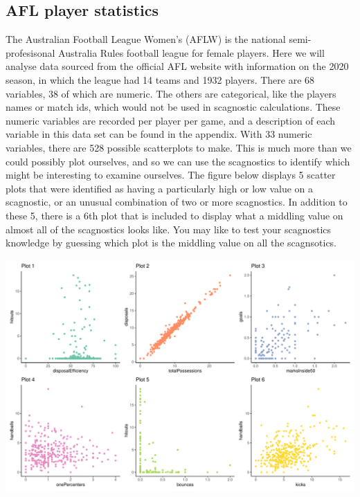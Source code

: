 \hypertarget{afl-player-statistics}{%
\subsection{AFL player statistics}\label{afl-player-statistics}}

The Australian Football League Women's (AFLW) is the national
semi-profesisonal Australia Rules football league for female players.
Here we will analyse data sourced from the official AFL website with
information on the 2020 season, in which the league had 14 teams and
1932 players. There are 68 variables, 38 of which are numeric. The
others are categorical, like the players names or match ids, which would
not be used in scagnostic calculations. These numeric variables are
recorded per player per game, and a description of each variable in this
data set can be found in the appendix. With 33 numeric variables, there
are 528 possible scatterplots to make. This is much more than we could
possibly plot ourselves, and so we can use the scagnostics to identify
which might be interesting to examine ourselves. The figure below
displays 5 scatter plots that were identified as having a particularly
high or low value on a scagnostic, or an unusual combination of two or
more scagnostics. In addition to these 5, there is a 6th plot that is
included to display what a middling value on almost all of the
scagnostics looks like. You may like to test your scagnostics knowledge
by guessing which plot is the middling value on all the scagnsotics.

\begin{Schunk}


\begin{center}\includegraphics[width=0.8\linewidth]{mason-lee-laa-cook_files/figure-latex/AFLW-scatters-static-1} \end{center}

\end{Schunk}


